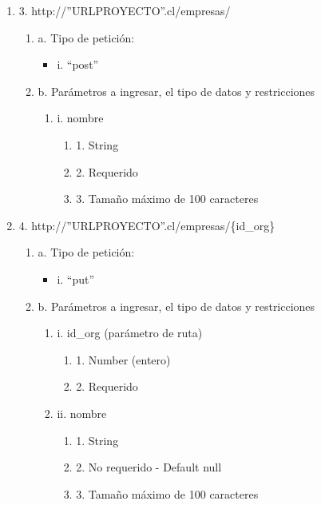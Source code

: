 \begin{enumerate}
    \item 3. http://”URLPROYECTO”.cl/empresas/
    \begin{enumerate}
        \item a. Tipo de petición:
            \begin{itemize}
               \item i. “post”
            \end{itemize}
        \item b. Parámetros a ingresar, el tipo de datos y restricciones
            \begin{enumerate}
                \item i. nombre
                    \begin{enumerate}
                        \item 1. String
                        \item 2. Requerido
                        \item 3. Tamaño máximo de 100 caracteres
                    \end{enumerate}
            \end{enumerate}
    \end{enumerate}

    \item 4. http://”URLPROYECTO”.cl/empresas/\{id\_org\}
    \begin{enumerate}
        \item a. Tipo de petición:
            \begin{itemize}
               \item i. “put”
            \end{itemize}
        \item b. Parámetros a ingresar, el tipo de datos y restricciones
            \begin{enumerate}
                \item i. id\_org (parámetro de ruta)
                    \begin{enumerate}
                        \item 1. Number (entero)
                        \item 2. Requerido
                    \end{enumerate}
                \item ii. nombre
                    \begin{enumerate}
                        \item 1. String
                        \item 2. No requerido - Default null
                        \item 3. Tamaño máximo de 100 caracteres
                    \end{enumerate}
            \end{enumerate}
    \end{enumerate}


\end{enumerate}
